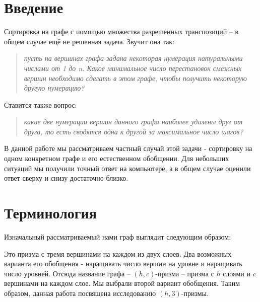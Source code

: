 \documentclass[a4paper,12pt]{llncs}
\begin{document}
\[\]
\[\]

\section{Введение}

Сортировка на графе с помощью множества разрешенных транспозиций -- в общем случае ещё не решенная задача. Звучит она так:
\begin{quote}
\textit{
пусть на вершинах графа задана некоторая нумерация натуральными числами от 1 до n. Какое минимальное число перестановок смежных
вершин необходимо сделать в этом графе, чтобы получить некоторую другую нумерацию?
}
\end{quote}
Ставится также вопрос:
\begin{quote}
\textit{
какие две нумерации вершин данного графа наиболее удалены друг от друга, то есть сводятся одна к другой за максимальное число шагов?
}
\end{quote}

В данной работе мы рассматриваем частный случай этой задачи - сортировку на одном конкретном графе и его естественном обобщении. Для небольших ситуаций мы получили точный ответ на компьютере, а в общем случае оценили ответ сверху и снизу достаточно близко.

\newpage
\section{Терминология}

Изначальный рассматриваемый нами граф выглядит следующим образом:

\begin{center}
\end{center}

    Это призма с тремя вершинами на каждом из двух слоев. Два возможных варианта его обобщения - наращивать число вершин на уровне
и наращивать число уровней. Отсюда название графа -- $(h, c)$-призма -- призма с $h$ слоями и $c$ вершинами на каждом слое. Мы выбрали второй
вариант обобщения. Таким образом, данная работа посвящена исследованию $(h, 3)$-призмы.
\end{document}

